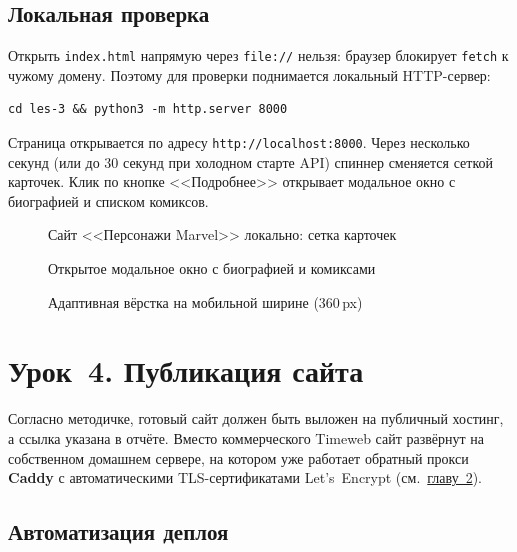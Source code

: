 \subsection{Локальная проверка}

Открыть \texttt{index.html} напрямую через \texttt{file://} нельзя:
браузер блокирует \texttt{fetch} к чужому домену. Поэтому для проверки
поднимается локальный HTTP-сервер:

\begin{lstlisting}
cd les-3 && python3 -m http.server 8000
\end{lstlisting}

Страница открывается по адресу \texttt{http://localhost:8000}. Через
несколько секунд (или до \(30\) секунд при холодном старте API)
спиннер сменяется сеткой карточек. Клик по кнопке <<Подробнее>>
открывает модальное окно с биографией и списком комиксов.

\begin{figure}[h]
  \centering
  \caption{Сайт <<Персонажи Marvel>> локально: сетка карточек}
  \label{fig:marvel_local}
\end{figure}

\begin{figure}[h]
  \centering
  \caption{Открытое модальное окно с биографией и комиксами}
  \label{fig:marvel_modal}
\end{figure}

\begin{figure}[h]
  \centering
  \caption{Адаптивная вёрстка на мобильной ширине (\(360\,\)px)}
  \label{fig:marvel_mobile}
\end{figure}

\section{Урок~4. Публикация сайта}

Согласно методичке, готовый сайт должен быть выложен на публичный
хостинг, а ссылка указана в отчёте. Вместо коммерческого Timeweb
сайт развёрнут на собственном домашнем сервере, на котором уже
работает обратный прокси \textbf{Caddy} с автоматическими
TLS-сертификатами Let's~Encrypt (см.~\hyperref[ch:project]{главу~2}).

\subsection{Автоматизация деплоя}

